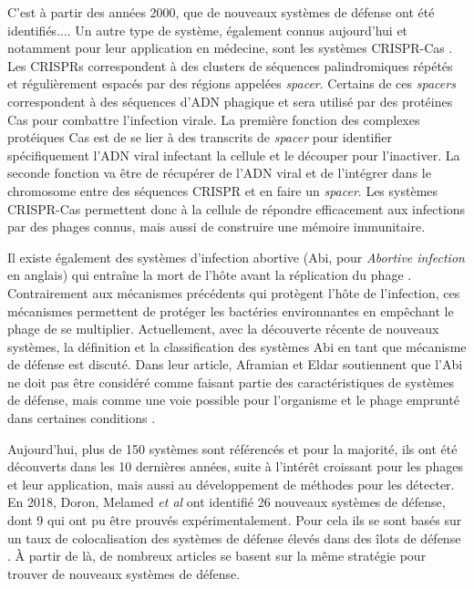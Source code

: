 C'est à partir des années 2000, que de nouveaux systèmes de défense ont été identifiés....
Un autre type de système, également connus aujourd'hui et notamment pour leur application en médecine, sont les systèmes CRISPR-Cas \cite{haft_guild_2005,barrangou_crispr_2007}. Les CRISPRs correspondent à des clusters de séquences palindromiques répétés et régulièrement espacés par des régions appelées \textit{spacer}. Certains de ces \textit{spacers} correspondent à des séquences d'ADN phagique et sera utilisé par des protéines Cas pour combattre l'infection virale. La première fonction des complexes protéiques Cas est de se lier à des transcrits de \textit{spacer} pour identifier spécifiquement l'ADN viral infectant la cellule et le découper pour l'inactiver. La seconde fonction va être de récupérer de l'ADN viral et de l'intégrer dans le chromosome entre des séquences CRISPR et en faire un \textit{spacer}. Les systèmes CRISPR-Cas permettent donc à la cellule de répondre efficacement aux infections par des phages connus, mais aussi de construire une mémoire immunitaire. 

Il existe également des systèmes d'infection abortive (Abi, pour \textit{Abortive infection} en anglais) qui entraîne la mort de l'hôte avant la réplication du phage \cite{molineux_host-parasite_1991}. Contrairement aux mécanismes précédents qui protègent l'hôte de l'infection, ces mécanismes permettent de protéger les bactéries environnantes en empêchant le phage de se multiplier. Actuellement, avec la découverte récente de nouveaux systèmes, la définition et la classification des systèmes Abi en tant que mécanisme de défense est discuté. Dans leur article, Aframian et Eldar soutiennent que l'Abi ne doit pas être considéré comme faisant partie des caractéristiques de systèmes de défense, mais comme une voie possible pour l'organisme et le phage emprunté dans certaines conditions \cite{aframian_abortive_2023}.

Aujourd'hui, plus de 150 systèmes sont référencés et pour la majorité, ils ont été découverts dans les 10 dernières années, suite à l'intérêt croissant pour les phages et leur application, mais aussi au développement de méthodes pour les détecter. En 2018, Doron, Melamed \textit{et al} \cite{doron_systematic_2018} ont identifié 26 nouveaux systèmes de défense, dont 9 qui ont pu être prouvés expérimentalement. Pour cela ils se sont basés sur un taux de colocalisation des systèmes de défense élevés dans des îlots de défense \cite{makarova_defense_2011}. À partir de là, de nombreux articles se basent sur la même stratégie pour trouver de nouveaux systèmes de défense.

